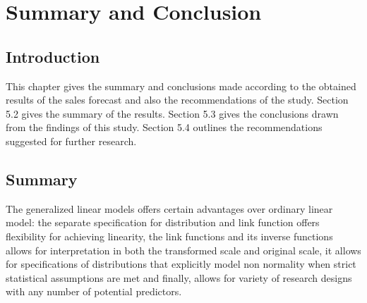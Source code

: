 \chapter{Summary and Conclusion} 
\label{Chapter5} 
\section{Introduction}
This chapter gives the summary and conclusions made according to the obtained results of the sales forecast and also the recommendations of the study. Section 5.2 gives the summary of the results. Section 5.3 gives the conclusions drawn from the findings of this study. Section 5.4 outlines the recommendations suggested for further research.

\section{Summary}
The generalized linear models offers certain advantages over ordinary linear model: the separate specification for distribution and link function offers flexibility for achieving linearity, the link functions and its inverse functions allows for interpretation in both the transformed scale and original scale, it allows for specifications of distributions that explicitly model non normality when strict statistical assumptions are met and finally, allows for variety of research designs with any number of  potential predictors.

